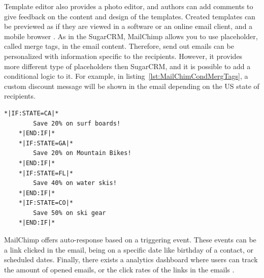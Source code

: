 Template editor also provides a photo editor, and authors can add comments to give feedback on the content and design of the templates. Created templates can be previewed as if they are viewed in a software or an online email client, and a mobile browser \citep{TheRocketScienceGroupLLC2013a}. As in the SugarCRM, MailChimp allows you to use placeholder, called merge tags, in the email content. Therefore, send out emails can be personalized with information specific to the recipients. However, it provides more different type of placeholders then SugarCRM, and it is possible to add a conditional logic to it. For example, in listing~\ref{lst:MailChimCondMergTags}, a custom discount message will be shown in the email depending on the US state of recipients.
\vspace{1cm}


\begin{lstlisting}[float, language=XML, caption={[MailChimp's Conditional Merge Tags]MailChimp's Conditional Merge Tags \citep{TheRocketScienceGroupLLC2013b}}, label={lst:MailChimCondMergTags}]
	*|IF:STATE=CA|*
		Save 20% on surf boards!
	*|END:IF|* 
	*|IF:STATE=GA|*
		Save 20% on Mountain Bikes!
	*|END:IF|* 
	*|IF:STATE=FL|*
		Save 40% on water skis!
	*|END:IF|* 
	*|IF:STATE=CO|*
		Save 50% on ski gear
	*|END:IF|*
\end{lstlisting}

MailChimp offers auto-response based on a triggering event. These events can be a link clicked in the email, being on a specific date like birthday of a contact, or scheduled dates. Finally, there exists a analytics dashboard where users can track the amount of opened emails, or the click rates of the links in the emails \citep{TheRocketScienceGroupLLC2013c,TheRocketScienceGroupLLC2013d}.

